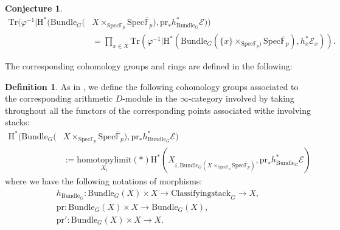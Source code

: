 \documentclass[11pt]{book}
\newtheorem{conjecture}[theorem]{Conjecture}
\theoremstyle{definition}
\newtheorem{definition}[theorem]{Definition}
\numberwithin{equation}{section}
\begin{document}
\begin{conjecture}
\begin{align}
\mathrm{Tr}(\varphi^{-1}|\mathrm{H}^*(\mathrm{Bundle}_G(&X\times_{\mathrm{Spec}\mathbb{F}_p} \mathrm{Spec}\overline{\mathbb{F}}_p),\mathrm{pr}_*h_{\mathrm{Bundle}_G}^*\mathcal{E}))\\
&=\prod_{x\in X} \mathrm{Tr}(\varphi^{-1}|\mathrm{H}^*(\mathrm{Bundle}_G(\{x\}\times_{\mathrm{Spec}\mathbb{F}_p)} \mathrm{Spec}\overline{\mathbb{F}}_p),h_x^*{\mathcal{E}}_x)).	
\end{align}
\end{conjecture}

The corresponding cohomology groups and rings are defined in the following:

\begin{definition}
As in \cite[Construction 3.2.5.1]{GL1}, we define the following cohomology groups associated to the corresponding arithmetic $D$-module in the $\infty$-category involved by taking throughout all the functors of the corresponding points associated withe involving stacks:
\begin{align}
\mathrm{H}^*(\mathrm{Bundle}_G(&X\times_{\mathrm{Spec}\mathbb{F}_p} \mathrm{Spec}\overline{\mathbb{F}}_p),\mathrm{pr}_*h_{\mathrm{Bundle}_G}^*\mathcal{E})\\
&:=\underset{X_i}{\mathrm{homotopylimit}}(*)\mathrm{H}^*(X_{i,\mathrm{Bundle}_G(X\times_{\mathrm{Spec}\mathbb{F}_p} \mathrm{Spec}\overline{\mathbb{F}}_p)},\mathrm{pr}_*h_{\mathrm{Bundle}_G}^*\mathcal{E})
\end{align}
where we have the following notations of morphisms:
\begin{align}
h_{\mathrm{Bundle}_G}:\mathrm{Bundle}_G(X)\times X\rightarrow \mathrm{Classifyingstack}_G\rightarrow X,\\
\mathrm{pr}:\mathrm{Bundle}_G(X)\times X\rightarrow \mathrm{Bundle}_G(X),\\
\mathrm{pr}': \mathrm{Bundle}_G(X)\times X\rightarrow X.	
\end{align}
	
\end{definition}
\end{document}
